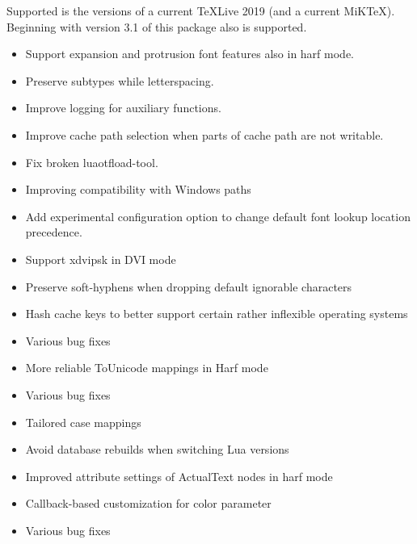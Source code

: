 Supported is the  versions of a current TeXLive 2019 (and a current MiKTeX). Beginning with version 3.1 of this package also  is supported.
\endsection

\begin{itemize}
  \item Support expansion and protrusion font features also in harf mode.
\end{itemize}
\endsubsection

\begin{itemize}
  \item Preserve subtypes while letterspacing.
  \item Improve logging for auxiliary functions.
  \item Improve cache path selection when parts of cache path are not writable.
  \item Fix broken luaotfload-tool.
\end{itemize}
\endsubsection

\begin{itemize}
  \item Improving compatibility with Windows paths
\end{itemize}
\endsubsection

\begin{itemize}
  \item Add experimental configuration option to change default font lookup location
    precedence.
  \item Support xdvipsk in DVI mode
  \item Preserve soft-hyphens when dropping default ignorable characters
  \item Hash cache keys to better support certain rather inflexible operating
    systems
  \item Various bug fixes
\end{itemize}
\endsubsection

\begin{itemize}
  \item More reliable ToUnicode mappings in Harf mode
  \item Various bug fixes
\end{itemize}
\endsubsection

\begin{itemize}
  \item Tailored case mappings
  \item Avoid database rebuilds when switching Lua versions
  \item Improved attribute settings of ActualText nodes in harf mode
  \item Callback-based customization for color parameter
  \item Various bug fixes
\end{itemize}
\endsubsection

